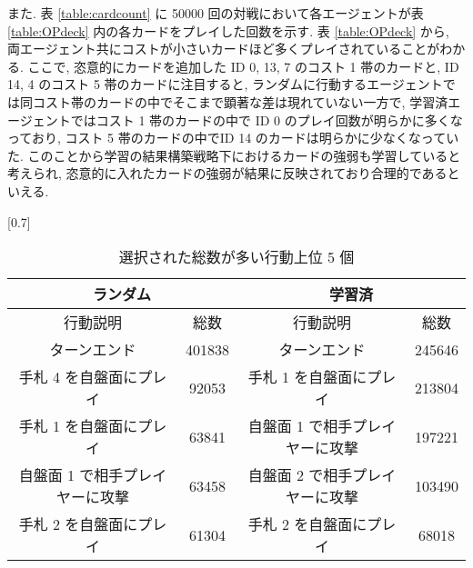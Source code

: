 \documentclass[twocolumn]{jarticle}
\begin{document}
       また. 表 \ref{table:cardcount} に 50000 回の対戦において各エージェントが表 \ref{table:OPdeck} 内の各カードをプレイした回数を示す. 表 \ref{table:OPdeck} から, 両エージェント共にコストが小さいカードほど多くプレイされていることがわかる. ここで, 恣意的にカードを追加した ID 0, 13, 7 のコスト 1 帯のカードと, ID 14, 4 のコスト 5 帯のカードに注目すると, ランダムに行動するエージェントでは同コスト帯のカードの中でそこまで顕著な差は現れていない一方で, 学習済エージェントではコスト 1 帯のカードの中で ID 0 のプレイ回数が明らかに多くなっており, コスト 5 帯のカードの中でID 14 のカードは明らかに少なくなっていた. このことから学習の結果構築戦略下におけるカードの強弱も学習していると考えられ, 恣意的に入れたカードの強弱が結果に反映されており合理的であるといえる. 
       \begin{table}[t]
         \centering
         \caption{選択された総数が多い行動上位 5 個}
         \vspace{-0.3cm}
         \label{table:actioncount}
         \scalebox{0.7}[0.7]{
           \begin{tabular}{|cc|cc|}
             \hline
             \multicolumn{2}{|c|}{ランダム}      & \multicolumn{2}{c|}{学習済}       \\ \hline
             \multicolumn{1}{|c|}{行動説明} & 総数 & \multicolumn{1}{c|}{行動説明} & 総数 \\ \hline \hline
             \multicolumn{1}{|c|}{ターンエンド}    & 401838  & \multicolumn{1}{c|}{ターンエンド}    & 245646  \\ \hline
             \multicolumn{1}{|c|}{手札 4 を自盤面にプレイ}    &  92053  & \multicolumn{1}{c|}{手札 1 を自盤面にプレイ}    & 213804  \\ \hline
             \multicolumn{1}{|c|}{手札 1 を自盤面にプレイ}    & 63841  & \multicolumn{1}{c|}{自盤面 1 で相手プレイヤーに攻撃}    & 197221  \\ \hline
             \multicolumn{1}{|c|}{自盤面 1 で相手プレイヤーに攻撃}    & 63458  & \multicolumn{1}{c|}{自盤面 2 で相手プレイヤーに攻撃}    & 103490  \\ \hline
             \multicolumn{1}{|c|}{手札 2 を自盤面にプレイ}    & 61304  & \multicolumn{1}{c|}{手札 2 を自盤面にプレイ}    & 68018  \\ \hline
             \end{tabular}
         }
       \end{table}
\end{document}

